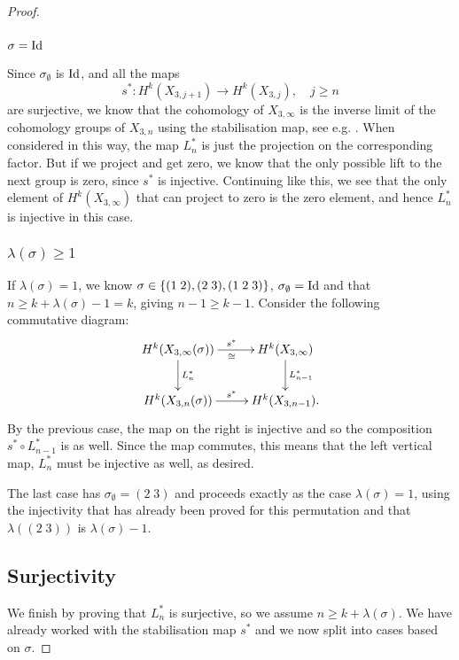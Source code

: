 \begin{proof}
  \subsubsection{$\sigma = \operatorname{Id}$}
  
  Since $\sigma_{\emptyset}$ is $\operatorname{Id}$, and all the maps
  \[ s^* : H^k(X_{3,j+1}) \to H^k(X_{3,j}), \quad j \geq n \]
  are surjective, we know that the cohomology
  of $X_{3,\infty}$ is the inverse
  limit of the cohomology groups of $X_{3,n}$ using the stabilisation
  map, see e.g. \cite[Chapter 19.4]{may}.
  When considered in this way, the map $L_n^*$ is just the projection on
  the corresponding factor. But if we project and get zero, we know that
  the only possible lift to the next group is zero, since $s^*$ is
  injective. Continuing like this, we see that the only element of
  $H^k(X_{3,\infty})$ that can project to zero is the zero element, and
  hence $L_n^*$ is injective in this case.
  
  \subsubsection{$\lambda(\sigma) \geq 1$}
  
  If $\lambda(\sigma)=1$, we know $\sigma \in
  \left\{ (1\;2),(2\;3),(1\;2\;3) \right\}$,
  $\sigma_{\emptyset} = \operatorname{Id}$ and that $n \geq k + \lambda(\sigma) - 1 =
  k$, giving $n-1\geq k-1$. Consider the following commutative diagram:
  \[ \xymatrix{ H^k(X_{3,\infty}(\sigma)) \ar[r]^{s^*}_{\cong}
    \ar[d]^{L_n^*} & 
    H^k(X_{3,\infty}) \ar[d]^{L_{n-1}^*} \\
    H^k(X_{3,n}(\sigma)) \ar[r]^{s^*} & H^k(X_{3,n-1}).
  } \]
  By the previous case, the map on the right is injective and so the
  composition $s^* \circ L_{n-1}^*$ is as well. Since the map commutes,
  this means that the left vertical map, $L_n^*$ must be injective as
  well, as desired.
  
  The last case has $\sigma_{\emptyset} = (2\;3)$ and proceeds exactly
  as the case $\lambda(\sigma) = 1$, using the injectivity that has
  already been proved for this permutation and that $\lambda((2\;3))$ is
  $\lambda(\sigma)-1$.
  
  \subsection{Surjectivity}
  
  We finish by proving that $L_n^*$ is surjective, so we assume $n \geq
  k+\lambda(\sigma)$. We have already
  worked with the stabilisation map $s^*$ and we now split into cases
  based on $\sigma$.
  

\end{proof}
